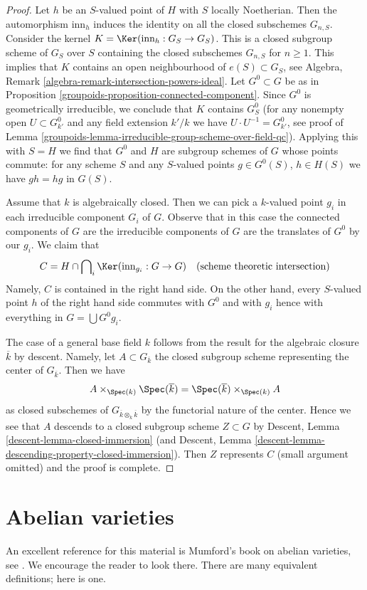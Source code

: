 \begin{proof}
\medskip\noindent
Let $h$ be an $S$-valued point of $H$ with $S$ locally Noetherian.
Then the automorphism $\text{inn}_h$ induces the identity on all
the closed subschemes $G_{n, S}$. Consider the kernel
$K = \Ker(\text{inn}_h : G_S \to G_S)$.
This is a closed subgroup scheme of $G_S$ over $S$ containing the
closed subschemes $G_{n, S}$ for $n \geq 1$.
This implies that $K$ contains an open neighbourhood of
$e(S) \subset G_S$, see
Algebra, Remark \ref{algebra-remark-intersection-powers-ideal}.
Let $G^0 \subset G$ be as in Proposition \ref{groupoids-proposition-connected-component}.
Since $G^0$ is geometrically irreducible, we conclude that $K$ contains
$G^0_S$ (for any nonempty open $U \subset G^0_{k'}$ and any field extension
$k'/k$ we have $U \cdot U^{-1} = G^0_{k'}$, see proof of
Lemma \ref{groupoids-lemma-irreducible-group-scheme-over-field-qc}).
Applying this with $S = H$ we find that $G^0$ and $H$
are subgroup schemes of $G$ whose points commute: for any scheme $S$
and any $S$-valued points $g \in G^0(S)$, $h \in H(S)$ we have
$gh = hg$ in $G(S)$.

\medskip\noindent
Assume that $k$ is algebraically closed. Then we can pick a $k$-valued
point $g_i$ in each irreducible component $G_i$ of $G$. Observe that in
this case the connected components of $G$ are the irreducible components
of $G$ are the translates of $G^0$ by our $g_i$. We claim that
$$
C = H \cap \bigcap\nolimits_i \Ker(\text{inn}_{g_i} : G \to G)
\quad (\text{scheme theoretic intersection})
$$
Namely, $C$ is contained in the right hand side. On the other hand, every
$S$-valued point $h$ of the right hand side commutes with $G^0$
and with $g_i$ hence with everything in $G = \bigcup G^0g_i$.

\medskip\noindent
The case of a general base field $k$ follows from the result for the
algebraic closure $\overline{k}$ by descent. Namely, let
$A \subset G_{\overline{k}}$ the closed subgroup scheme representing
the center of $G_{\overline{k}}$. Then we have
$$
A \times_{\Spec(k)} \Spec(\overline{k}) =
\Spec(\overline{k}) \times_{\Spec(k)} A
$$
as closed subschemes of $G_{\overline{k} \otimes_k \overline{k}}$ by
the functorial nature of the center. Hence we see that $A$ descends
to a closed subgroup scheme $Z \subset G$ by
Descent, Lemma \ref{descent-lemma-closed-immersion}
(and Descent, Lemma \ref{descent-lemma-descending-property-closed-immersion}).
Then $Z$ represents $C$ (small argument omitted) and the proof is complete.
\end{proof}

\section{Abelian varieties}
\label{groupoids-section-abelian-varieties}
An excellent reference for this material is Mumford's book on
abelian varieties, see \cite{AVar}. We encourage the reader to
look there. There are many equivalent definitions; here is one.

